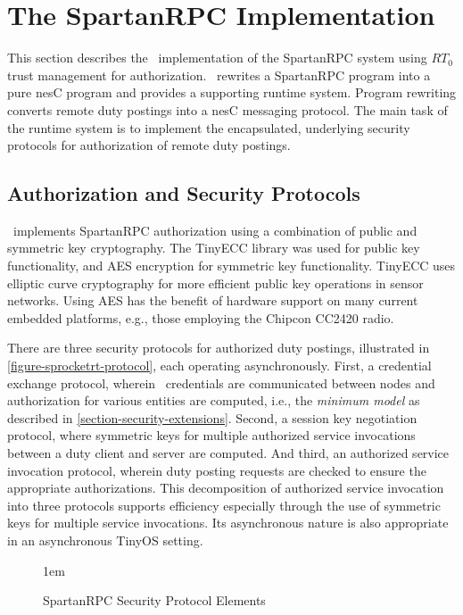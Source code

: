\section{The SpartanRPC Implementation}
\label{section-implementation}

This section describes the \Sprocket\ implementation of the SpartanRPC system using $RT_0$ trust
management for authorization. \Sprocket\ rewrites a SpartanRPC program into a pure nesC program
and provides a supporting runtime system. Program rewriting converts remote duty postings into a
nesC messaging protocol. The main task of the runtime system is to implement the encapsulated,
underlying security protocols for authorization of remote duty postings.

\subsection{Authorization and Security Protocols}
\label{section-security-protocols}
\label{section-underlying-protocols}

\Sprocket\ implements SpartanRPC authorization using a combination of public and symmetric key
cryptography. The TinyECC library \cite{Liu-Peng-TinyECC-2008} was used for public key
functionality, and AES encryption for symmetric key functionality. TinyECC uses elliptic curve
cryptography for more efficient public key operations in sensor networks. Using AES has the
benefit of hardware support on many current embedded platforms, e.g., those employing the
Chipcon CC2420 radio.

There are three security protocols for authorized duty postings, illustrated in
\autoref{figure-sprocketrt-protocol}, each operating asynchronously. First, a credential
exchange protocol, wherein \RT\ credentials are communicated between nodes and authorization for
various entities are computed, i.e., the \emph{minimum model} as described in
\autoref{section-security-extensions}. Second, a session key negotiation protocol, where
symmetric keys for multiple authorized service invocations between a duty client and server are
computed. And third, an authorized service invocation protocol, wherein duty posting requests
are checked to ensure the appropriate authorizations. This decomposition of authorized service
invocation into three protocols supports efficiency especially through the use of symmetric keys
for multiple service invocations. Its asynchronous nature is also appropriate in an asynchronous
TinyOS setting.

\begin{figure}[t]
  
  \centerline{\raise 1em\box\graph}
  \vspace{2mm}
  \caption{SpartanRPC Security Protocol Elements}
  \label{figure-sprocketrt-protocol}
\end{figure}

